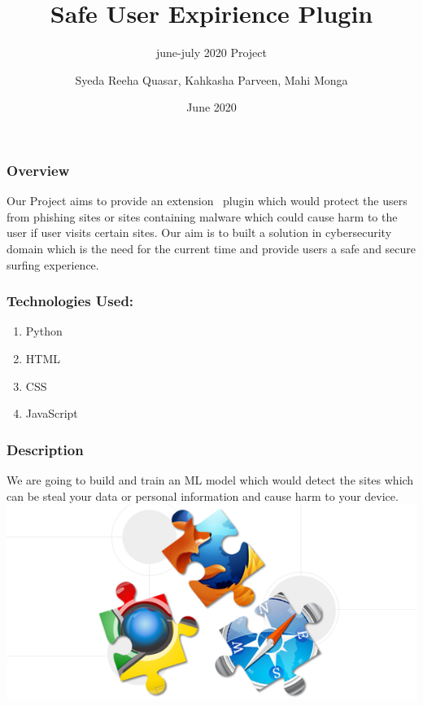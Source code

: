 \documentclass[14pt]{beamer}
\title[SUE]{Safe User Expirience Plugin}
\subtitle{june-july 2020 Project}
\author[Team 36]{Syeda Reeha Quasar, Kahkasha Parveen, Mahi Monga}
\date{June 2020}
\begin{document}
\begin{frame}
    \titlepage
\end{frame}

\begin{frame}
    \frametitle{Overview}
    Our Project aims to provide an extension \ plugin which would protect the users from phishing sites or sites containing malware which could cause harm to the user if user visits certain sites.
    Our aim is to built a solution in cybersecurity domain which is the need for the current time and provide users a safe and secure surfing experience.
\end{frame}

\begin{frame}
    \frametitle{Technologies Used:}
    \begin{enumerate}
        \item{Python}
        \item{HTML}
        \item{CSS}
        \item{JavaScript}
    \end{enumerate}
\end{frame}

\begin{frame}
    \frametitle{Description}
    We are going to build and train an ML model which would detect the sites which can be steal your data or personal information and cause harm to your device.
    \includegraphics{imag}
    \href{https://developer.chrome.com/extensions/getstarted}{}
\end{frame}
\end{document}
